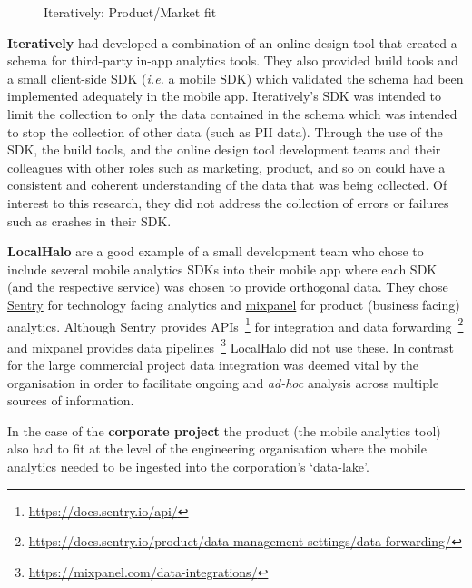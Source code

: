 \begin{figure}[htbp!]
\begin{minipage}{.45\textwidth}
  \label{fig:iteratively-dot-voting-example}
\end{minipage}
    \caption{Iteratively: Product/Market fit}
    \label{fig:iteratively-product-market-fit}
\end{figure}

\textbf{Iteratively} had developed a combination of an online design tool that created a schema for third-party in-app analytics tools. They also provided build tools and a small client-side SDK (\textit{i.e.} a mobile SDK) which validated the schema had been implemented adequately in the mobile app. %
Iteratively's SDK was intended to limit the collection to only the data contained in the schema which was intended to stop the collection of other data (such as PII data). Through the use of the SDK, the build tools, and the online design tool development teams and their colleagues with other roles such as marketing, product, and so on could have a consistent and coherent understanding of the data that was being collected. Of interest to this research, they did not address the collection of errors or failures such as crashes in their SDK.

\textbf{LocalHalo} are a good example of a small development team who chose to include several mobile analytics SDKs into their mobile app where each SDK (and the respective service) was chosen to provide orthogonal data. They chose \href{https://sentry.io/}{Sentry} for technology facing analytics and \href{https://mixpanel.com/}{mixpanel} for product (business facing) analytics. Although Sentry provides APIs~\footnote{\url{https://docs.sentry.io/api/}} for integration and data forwarding~\footnote{\url{https://docs.sentry.io/product/data-management-settings/data-forwarding/}} and mixpanel provides data pipelines~\footnote{\url{https://mixpanel.com/data-integrations/}} LocalHalo did not use these. In contrast for the large commercial project data integration was deemed vital by the organisation in order to facilitate ongoing and \emph{ad-hoc} analysis across multiple sources of information. 

In the case of the \textbf{corporate project} the product (the mobile analytics tool) also had to fit at the level of the engineering organisation where the mobile analytics needed to be ingested into the corporation's `data-lake'. 

